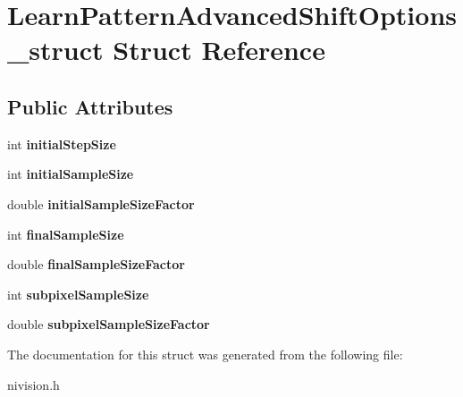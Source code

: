 \hypertarget{structLearnPatternAdvancedShiftOptions__struct}{
\section{LearnPatternAdvancedShiftOptions\_\-struct Struct Reference}
\label{structLearnPatternAdvancedShiftOptions__struct}
}
\subsection*{Public Attributes}
\begin{DoxyCompactItemize}
\item 
\hypertarget{structLearnPatternAdvancedShiftOptions__struct_a498a19cd7d8fee74c9b869cf71398c34}{
int {\bfseries initialStepSize}}
\label{structLearnPatternAdvancedShiftOptions__struct_a498a19cd7d8fee74c9b869cf71398c34}

\item 
\hypertarget{structLearnPatternAdvancedShiftOptions__struct_a9d9111d65d74f9ec99e949be3be130a7}{
int {\bfseries initialSampleSize}}
\label{structLearnPatternAdvancedShiftOptions__struct_a9d9111d65d74f9ec99e949be3be130a7}

\item 
\hypertarget{structLearnPatternAdvancedShiftOptions__struct_ac74501223629b9a7f514b7f229a14343}{
double {\bfseries initialSampleSizeFactor}}
\label{structLearnPatternAdvancedShiftOptions__struct_ac74501223629b9a7f514b7f229a14343}

\item 
\hypertarget{structLearnPatternAdvancedShiftOptions__struct_a1f83aaaf9259b16f89ba7deafe09b48c}{
int {\bfseries finalSampleSize}}
\label{structLearnPatternAdvancedShiftOptions__struct_a1f83aaaf9259b16f89ba7deafe09b48c}

\item 
\hypertarget{structLearnPatternAdvancedShiftOptions__struct_a98fd6a92dbd7354208b2c727c799ba4c}{
double {\bfseries finalSampleSizeFactor}}
\label{structLearnPatternAdvancedShiftOptions__struct_a98fd6a92dbd7354208b2c727c799ba4c}

\item 
\hypertarget{structLearnPatternAdvancedShiftOptions__struct_a8bc6ef603b6e71043a498d2fafdeaa77}{
int {\bfseries subpixelSampleSize}}
\label{structLearnPatternAdvancedShiftOptions__struct_a8bc6ef603b6e71043a498d2fafdeaa77}

\item 
\hypertarget{structLearnPatternAdvancedShiftOptions__struct_a0a660c7675d69391e741011af218b1b8}{
double {\bfseries subpixelSampleSizeFactor}}
\label{structLearnPatternAdvancedShiftOptions__struct_a0a660c7675d69391e741011af218b1b8}

\end{DoxyCompactItemize}


The documentation for this struct was generated from the following file:\begin{DoxyCompactItemize}
\item 
nivision.h\end{DoxyCompactItemize}
